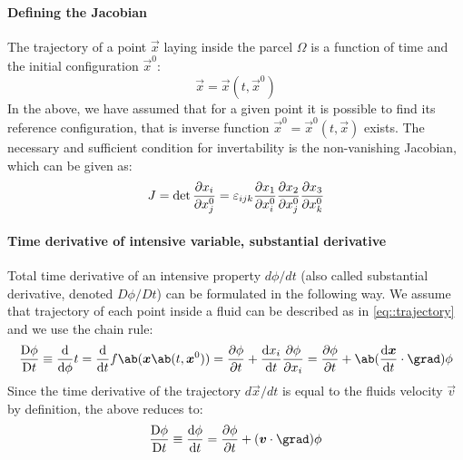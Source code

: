 \documentclass[justified, nobib,a4paper]{tufte-handout}
\begin{document}
\paragraph{Defining the Jacobian}
The trajectory of a point \(\vec{x}\) laying inside 
the parcel \(\Omega\) is a function of time and the initial 
configuration \(\vec{x}^0\):
\begin{equation}
  \vec{x} = \vec{x}(t, \vec{x}^0)
  \label{eq::trajectory}
\end{equation}
In the above, we have assumed that for a given point it is possible 
to find its reference configuration, that is inverse function 
\(\vec{x}^0 = \vec{x}^0(t, \vec{x})\) exists.
The necessary and sufficient condition for invertability is the 
non-vanishing Jacobian, which can be given as:
\begin{equation}\label{eq::jacobian}
  J = \det\pdv{x_i}{x^0_j} 
  = \varepsilon_{{i}{j}{k}} \pdv{x_1}{x^0_i}\pdv{x_2}{x^0_j}\pdv{x_3}{x^0_k}
\end{equation}

\paragraph{Time derivative of intensive variable, substantial derivative}
Total time derivative of an intensive property \(d \phi / d t\) 
(also called substantial derivative, denoted \(D\phi/Dt\)) can be formulated 
in the following way. We assume that trajectory of each point inside a fluid can
be described as in \autoref{eq::trajectory} and 
we use the chain rule:
\begin{equation*}
  \mdv{\phi}{t} \equiv \odv{}{\phi}{t}  
  =  \odv{}{t}f\ab(\vec{x}\ab(t,\vec{x}^0))
  = \pdv{\phi}{t} + \odv{x_i}{t} \pdv{\phi}{x_i}
  = \pdv{\phi}{t} + \ab(\odv{\vec{x}}{t} \cdot \grad )\phi
\end{equation*}
Since the time derivative of the trajectory \(d\vec{x} / dt\) is equal 
to the fluids velocity \(\vec{v}\) by definition, the above reduces to:
\begin{equation}
  \mdv{\phi}{t} \equiv \odv{\phi}{t} 
  = \pdv{\phi}{t} + (\vec{v} \cdot \grad) \phi
\end{equation}
\end{document}
